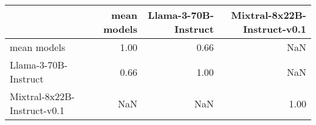 \begin{tabular}{lrrr}
\toprule
 & mean models & Llama-3-70B-Instruct & Mixtral-8x22B-Instruct-v0.1 \\
\midrule
mean models & 1.00 & 0.66 & NaN \\
Llama-3-70B-Instruct & 0.66 & 1.00 & NaN \\
Mixtral-8x22B-Instruct-v0.1 & NaN & NaN & 1.00 \\
\bottomrule
\end{tabular}
